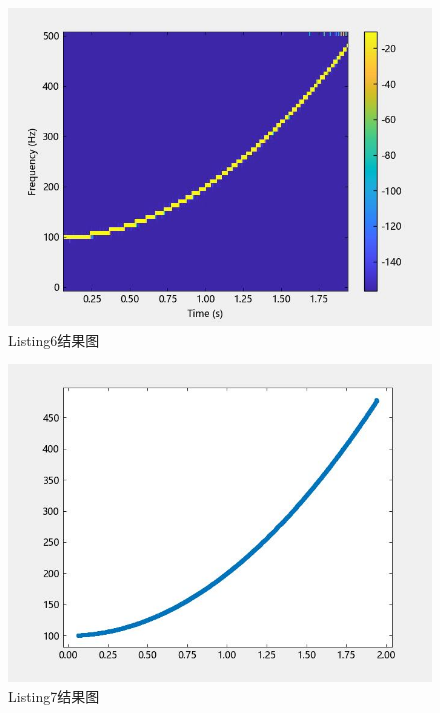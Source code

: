 \documentclass{article}
\begin{document}
	\begin{figure}[htbp]
		\centering
		\includegraphics{hw5(6).jpeg}
		\caption{Listing6结果图}
		\label{fig6}
	\end{figure}
	
	\begin{figure}[htbp]
		\centering
		\includegraphics{hw5(7).jpeg}
		\caption{Listing7结果图}
		\label{fig7}
	\end{figure}
	
\end{document}
